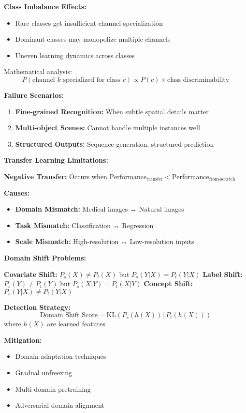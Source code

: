 \documentclass[12pt]{article}
\begin{document}
\begin{enumerate}[(a)]
{    \textbf{Class Imbalance Effects:}
    \begin{itemize}
        \item Rare classes get insufficient channel specialization
        \item Dominant classes may monopolize multiple channels
        \item Uneven learning dynamics across classes
    \end{itemize}
    
    Mathematical analysis:
    $$P(\text{channel } k \text{ specialized for class } c) \propto P(c) \times \text{class discriminability}$$
    
    \textbf{Failure Scenarios:}
    \begin{enumerate}
        \item \textbf{Fine-grained Recognition:} When subtle spatial details matter
        \item \textbf{Multi-object Scenes:} Cannot handle multiple instances well
        \item \textbf{Structured Outputs:} Sequence generation, structured prediction
    \end{enumerate}
    
    \textbf{Transfer Learning Limitations:}
    
    \textbf{Negative Transfer:}
    Occurs when $\text{Performance}_{\text{transfer}} < \text{Performance}_{\text{from-scratch}}$
    
    \textbf{Causes:}
    \begin{itemize}
        \item \textbf{Domain Mismatch:} Medical images ↔ Natural images
        \item \textbf{Task Mismatch:} Classification ↔ Regression
        \item \textbf{Scale Mismatch:} High-resolution ↔ Low-resolution inputs
    \end{itemize}
    
    \textbf{Domain Shift Problems:}
    
    \textbf{Covariate Shift:} $P_s(X) \neq P_t(X)$ but $P_s(Y|X) = P_t(Y|X)$
    \textbf{Label Shift:} $P_s(Y) \neq P_t(Y)$ but $P_s(X|Y) = P_t(X|Y)$  
    \textbf{Concept Shift:} $P_s(Y|X) \neq P_t(Y|X)$
    
    \textbf{Detection Strategy:}
    $$\text{Domain Shift Score} = \text{KL}(P_s(h(X)) || P_t(h(X)))$$
    where $h(X)$ are learned features.
    
    \textbf{Mitigation:}
    \begin{itemize}
        \item Domain adaptation techniques
        \item Gradual unfreezing
        \item Multi-domain pretraining
        \item Adversarial domain alignment
    \end{itemize}
    
}
\end{enumerate}
\end{document}
